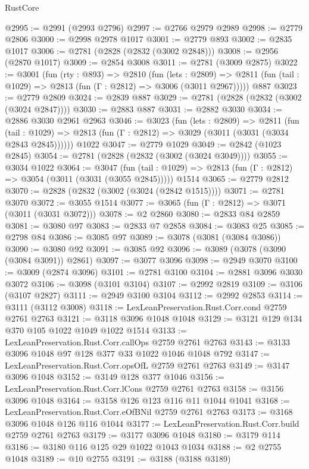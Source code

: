 \begin{lexlean}{RustCore}
\begin{coremodule}
@2995 := @2991 (@2993 @2796)
@2997 := @2766 @2979 @2989
@2998 := @2779 @2806
@3000 := @2998 @2978 @1017
@3001 := @2779 @893
@3002 := @2835 @1017
@3006 := @2781 (@2828 (@2832 (@3002 @2848)))
@3008 := @2956 (@2870 @1017)
@3009 := @2854 @3008
@3011 := @2781 (@3009 @2875)
@3022 := @3001
    (fun (rty : @893) =>
    @2810
      (fun (lets : @2809) =>
      @2811 (fun (tail : @1029) => @2813 (fun (Γ : @2812) => @3006 (@3011 @2967)))))
    @887
@3023 := @2779 @2809
@3024 := @2839 @887
@3029 := @2781 (@2828 (@2832 (@3002 (@3024 @2847))))
@3030 := @2883 @887
@3031 := @2882 @3030
@3034 := @2886 @3030 @2961 @2963
@3046 := @3023
    (fun (lets : @2809) =>
    @2811
      (fun (tail : @1029) => @2813 (fun (Γ : @2812) => @3029 (@3011 (@3031 (@3034 @2843 @2845))))))
    @1022
@3047 := @2779 @1029
@3049 := @2842 (@1023 @2845)
@3054 := @2781 (@2828 (@2832 (@3002 (@3024 @3049))))
@3055 := @3034 @1022
@3064 := @3047
    (fun (tail : @1029) => @2813 (fun (Γ : @2812) => @3054 (@3011 (@3031 (@3055 @2845)))))
    @1514
@3065 := @2779 @2812
@3070 := @2828 (@2832 (@3002 (@3024 (@2842 @1515))))
@3071 := @2781 @3070
@3072 := @3055 @1514
@3077 := @3065 (fun (Γ : @2812) => @3071 (@3011 (@3031 @3072)))
@3078 := @2 @2860
@3080 := @2833 @84 @2859
@3081 := @3080 @97
@3083 := @2833 @7 @2858
@3084 := @3083 @25
@3085 := @2798 @84
@3086 := @3085 @97
@3089 := @3078 (@3081 (@3084 @3086))
@3090 := @3080 @92
@3091 := @3085 @92
@3096 := @3089 (@3078 (@3090 (@3084 @3091)) @2861)
@3097 := @3077 @3096
@3098 := @2949 @3070
@3100 := @3009 (@2874 @3096)
@3101 := @2781 @3100
@3104 := @2881 @3096 @3030 @3072
@3106 := @3098 (@3101 @3104)
@3107 := @2992 @2819
@3109 := @3106 (@3107 @2827)
@3111 := @2949 @3100 @3104
@3112 := @2992 @2853
@3114 := @3111 (@3112 @3008)
@3118 := LexLeanPreservation.Rust.Corr.cond @2759 @2761 @2763
@3121 := @3118 @3096 @1048 @1048
@3129 := @3121 @129 @134 @370 @105 @1022 @1049 @1022 @1514
@3133 := LexLeanPreservation.Rust.Corr.callOps @2759 @2761 @2763
@3143 := @3133 @3096 @1048 @97 @128 @377 @33 @1022 @1046 @1048 @792
@3147 := LexLeanPreservation.Rust.Corr.opsOfL @2759 @2761 @2763
@3149 := @3147 @3096 @1048
@3152 := @3149 @128 @377 @1046
@3156 := LexLeanPreservation.Rust.Corr.lCons @2759 @2761 @2763
@3158 := @3156 @3096 @1048
@3164 := @3158 @126 @123 @116 @11 @1044 @1041
@3168 := LexLeanPreservation.Rust.Corr.eOfBNil @2759 @2761 @2763
@3173 := @3168 @3096 @1048 @126 @116 @1044
@3177 := LexLeanPreservation.Rust.Corr.build @2759 @2761 @2763
@3179 := @3177 @3096 @1048
@3180 := @3179 @114
@3186 := @3180 @116 @125 @29 @1022 @1043 @1034
@3188 := @2 @2755 @1048
@3189 := @10 @2755
@3191 := @3188 (@3188 @3189)

\end{coremodule}
\end{lexlean}
